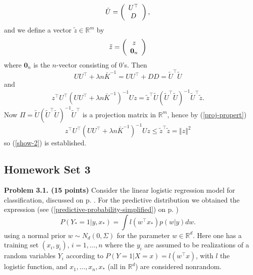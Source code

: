 \documentclass[11pt,twoside]{article}%
\theoremstyle{change}
\newenvironment{quote-env}{\begin{quote}\sffamily }{\end{quote}}
\newenvironment{mycomments-env}[1][Mycomments]{\textbf{#1.} \begin{quote-env} }{ \end{quote-env}  \ \rule{0.5em}{0.5em}}
\begin{document}
\begin{mycomments}
\begin{mycomments-env}
\[
\tilde{U}=\left(
\begin{array}
[c]{c}%
U^{\top}\\
D
\end{array}
\right)  ,
\]
and we define a vector $\tilde{z}\in\mathbb{R}^{m}$ by
\[
\tilde{z}=\left(
\begin{array}
[c]{c}%
z\\
\mathbf{0}_{n}%
\end{array}
\right)
\]
where $\mathbf{0}_{n}$ is the $n$-vector consisting of $0$'s. Then
\[
UU^{\top}+\lambda n\bar{K}^{-1}=UU^{\top}+DD=\tilde{U}^{\top}\tilde{U}%
\]
and
\[
z^{\top}U^{\top}\left(  UU^{\top}+\lambda n\bar{K}^{-1}\right)  ^{-1}%
Uz=\tilde{z}^{\top}\tilde{U}\left(  \tilde{U}^{\top}\tilde{U}\right)
^{-1}\tilde{U}^{\top}\tilde{z}.
\]
Now $\Pi=\tilde{U}\left(  \tilde{U}^{\top}\tilde{U}\right)  ^{-1}\tilde
{U}^{\top}$ is a projection matrix in $\mathbb{R}^{m}$, hence by
(\ref{proj-propert})
\[
z^{\top}U^{\top}\left(  UU^{\top}+\lambda n\bar{K}^{-1}\right)  ^{-1}%
Uz\leq\tilde{z}^{\top}\tilde{z}=\left\Vert z\right\Vert ^{2}%
\]
so (\ref{show-2}) is established.
\end{mycomments-env}%

\end{mycomments}%


\bigskip

\subsection{Homework Set 3\textbf{\ }}

\textbf{Problem 3.1. (15 points) }Consider the linear logistic regression
model for classification, discussed on p.
\pageref{predictive-probability-simplified}. For the predictive distribution
we obtained the expression (see (\ref{predictive-probability-simplified}) on
p. \pageref{predictive-probability-simplified})%
\[
P\left(  Y_{\ast}=1|y,x_{\ast}\right)  =\int l\left(  w^{\top}x_{\ast}\right)
p\left(  w|y\right)  dw.
\]
using a normal prior $w\sim N_{d}\left(  0,\Sigma\right)  $ for the parameter
$w\in\mathbb{R}^{d}$. Here one has a training set $\left(  x_{i},y_{i}\right)
$, $i=1,\ldots,n$ where the $y_{i}$ are assumed to be realizations of a random
variables $Y_{i}$ according to $P\left(  Y=1|X=x\right)  =l\left(  w^{\top
}x\right)  $, with $l$ the logistic function, and $x_{1},\ldots,x_{n},x_{\ast
}$ (all in $\mathbb{R}^{d}$) are considered nonrandom.
\end{document}
